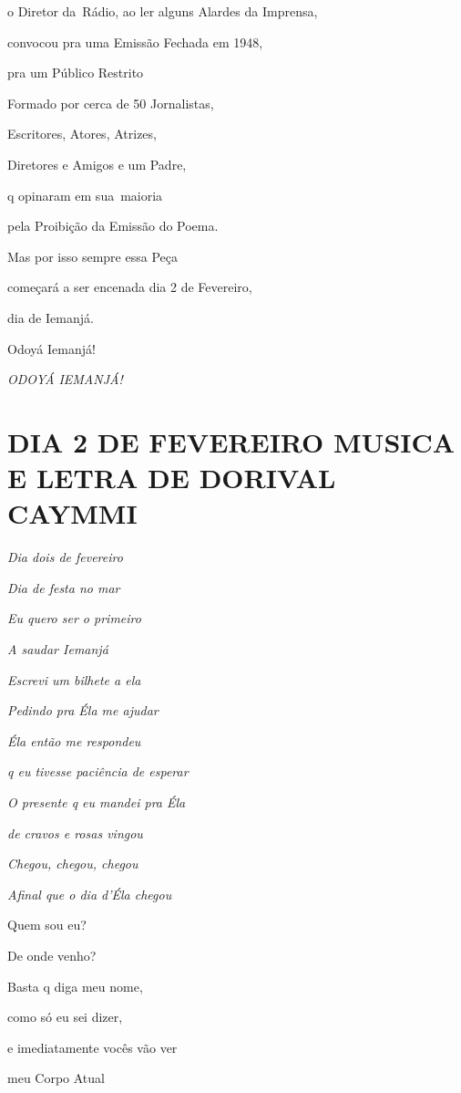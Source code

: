 o Diretor da~Rádio, ao ler alguns Alardes da Imprensa,

convocou pra uma Emissão Fechada em 1948,

pra um Público Restrito~

Formado por cerca de 50 Jornalistas,

Escritores, Atores, Atrizes,

Diretores e Amigos e um Padre,

q opinaram em sua~maioria

pela Proibição da Emissão do Poema.

Mas por isso sempre essa Peça

começará a ser encenada dia 2 de Fevereiro,

dia de Iemanjá.

Odoyá Iemanjá!~


\emph{ODOYÁ IEMANJÁ!}

\section*{DIA 2 DE FEVEREIRO MUSICA E LETRA DE DORIVAL CAYMMI}

\emph{Dia dois de fevereiro}

\emph{Dia de festa no mar}

\emph{Eu quero ser o primeiro}

\emph{A saudar Iemanjá}

\emph{Escrevi um bilhete a ela}

\emph{Pedindo pra Éla me ajudar}

\emph{Éla então me respondeu}

\emph{q eu tivesse paciência de esperar}

\emph{O presente q eu mandei pra Éla}

\emph{de cravos e rosas vingou}

\emph{Chegou, chegou, chegou}

\emph{Afinal que o dia d'Éla chegou}



Quem sou eu?~

De onde venho?~

Basta q diga meu nome,

como só eu sei dizer,~

e imediatamente vocês vão ver~

meu Corpo Atual~

